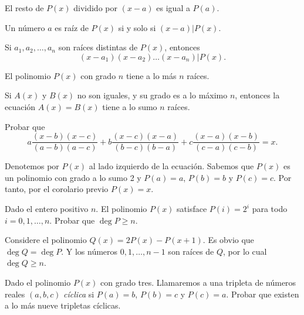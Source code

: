 \begin{theorem}
    El resto de $P(x)$ dividido por $(x - a)$ es igual a $P(a)$.
\end{theorem}

\begin{theorem}
    Un número $a$ es raíz de $P(x)$ si y solo si $(x - a) | P(x)$.
\end{theorem}

\begin{corollary}
    Si $a_1, a_2, \ldots, a_n$ son raíces distintas de $P(x)$, entonces
    \[
        (x - a_1)(x - a_2)\ldots(x - a_n) | P(x).
    \]
\end{corollary}

\begin{theorem}
    El polinomio $P(x)$ con grado $n$ tiene a lo más $n$ raíces.
\end{theorem}

\begin{corollary}
    Si $A(x)$ y $B(x)$ no son iguales, y su grado es a lo máximo $n$, entonces la ecuación $A(x) = B(x)$ tiene a lo sumo $n$ raíces.
\end{corollary}

\begin{example}
    Probar que
    \[
        a \frac{(x - b)(x - c)}{(a - b)(a - c)} + b \frac{(x - c)(x - a)}{(b - c)(b - a)} + c \frac{(x - a)(x - b)}{(c - a)(c - b)} = x.
    \]
\end{example}

\begin{solution}
    Denotemos por $P(x)$ al lado izquierdo de la ecuación.
    Sabemos que $P(x)$ es un polinomio con grado a lo sumo 2 y $P(a) = a$, $P(b) = b$ y $P(c) = c$.
    Por tanto, por el corolario previo $P(x) = x$.
\end{solution}

\begin{example}
    Dado el entero positivo $n$.
    El polinomio $P(x)$ satisface $P(i) = 2^i$ para todo $i = 0, 1, \ldots, n$.
    Probar que $\deg{P} \geq n$.
\end{example}

\begin{solution}
    Considere el polinomio $Q(x) = 2P(x) - P(x + 1)$.
    Es obvio que $\deg{Q} = \deg{P}$.
    Y los números $0, 1, \ldots, n-1$ son raíces de $Q$, por lo cual $\deg{Q} \geq n$.
\end{solution}

\begin{example}
    Dado el polinomio $P(x)$ con grado tres.
    Llamaremos a una tripleta de números reales $(a, b, c)$ \textit{cíclica} si $P(a) = b$, $P(b) = c$ y $P(c) = a$.
    Probar que existen a lo más nueve tripletas cíclicas.
\end{example}


